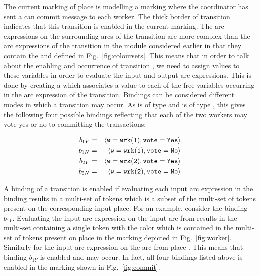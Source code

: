 The current marking of place  is  modelling a marking where the coordinator has sent a
can commit message to each worker. The thick border of transition
 indicates that this transition is enabled
in the current marking. The arc expressions on the surrounding arcs of
the  transition are more complex than the
arc expressions of the  transition in the
 module considered earlier in that they contain
the   and  defined in
Fig.~\ref{fig:coloursets}. This means that in order to talk about the
enabling and occurrence of transition , we
need to assign values to these variables in order to evaluate the
input and output arc expressions. This is done by creating a
 which associates a value to each of the free
variables occurring in the arc expression of the transition. Bindings
can be considered different modes in which a transition may occur.  As
 is of type  and  is of type
, this gives the following four possible bindings
reflecting that each of the two workers may vote yes or no to
committing the transactions:

\begin{eqnarray*}
b_{1Y} & = & \langle {\tt{w}} = {\tt{wrk(1)}}, {\tt{vote}} = {\tt{Yes}} \rangle \\
b_{1N} & = & \langle {\tt{w}} = {\tt{wrk(1)}}, {\tt{vote}} = {\tt{No}} \rangle \\
b_{2Y} & = & \langle {\tt{w}} = {\tt{wrk(2)}}, {\tt{vote}} = {\tt{Yes}} \rangle \\
b_{2N} & = & \langle {\tt{w}} = {\tt{wrk(2)}}, {\tt{vote}} = {\tt{No}} \rangle
\end{eqnarray*}

A binding of a transition is enabled if evaluating each input arc
expression in the binding results in a multi-set of tokens which is a
subset of the multi-set of tokens present on the corresponding input
place. For an example, consider the binding $b_{1Y}$. Evaluating the
input arc expression  on the input arc from 
results in the multi-set containing a single token with the color
 which is contained in the multi-set of tokens present
on place  in the marking depicted in
Fig.~\ref{fig:worker}. Similarly for the input arc expression on the
arc from place . This means that binding $b_{1Y}$
is enabled and may occur. In fact, all four bindings listed above
is enabled in the marking shown in Fig.~\ref{fig:commit}.

